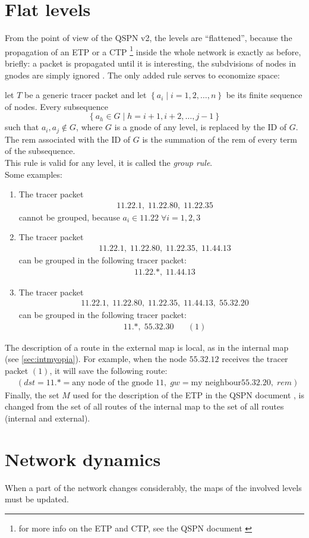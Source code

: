 \documentclass[a4paper]{article}
\newcommand{\T}[1]{\textrm{#1}}
\newcommand{\pgra}[1]{\left\{#1\right\}}
\newcommand{\eal}[1]{{\begin{align*} #1 \end{align*}}}
\def\'{{\;\;\;}}
\begin{document}
\section{Flat levels}
\label{sec:flat}
From the point of view of the QSPN v2, the levels are ``flattened'', because
the propagation of an ETP or a CTP \footnote{for more info on the ETP and CTP,
see the QSPN document \cite{qspndoc}} inside the whole network is exactly as
before, briefly: a packet is propagated until it is interesting, the
subdvisions of nodes in gnodes are simply ignored . The only
added rule serves to economize space: 

let $T$ be a generic tracer packet and let $\pgra{a_i\;|\;i=1,2,\dots,n}$ be its finite sequence of nodes.
Every subsequence \[\pgra{a_h\in G\;|\;h=i+1,i+2,\dots,j-1}\]
such that $a_i,a_j\notin G$, where $G$ is a gnode of any level, is replaced by
the ID of $G$. The rem associated with the ID of $G$ is the summation of the
rem of every term of the subsequence.\\
This rule is valid for any level, it is called the \emph{group rule}.\\
Some examples:
\begin{enumerate}
	\item The tracer packet
		\eal{&11.22.1,\;11.22.80,\;11.22.35}
		cannot be grouped, because $a_i\in 11.22\;\forall i =1,2,3$
	\item The tracer packet
		\eal{&11.22.1,\;11.22.80,\;11.22.35,\;11.44.13}
		can be grouped in the following tracer packet:
		\eal{&11.22.*,\;11.44.13}
	\item The tracer packet
		\eal{&11.22.1,\;11.22.80,\;11.22.35,\;11.44.13,\;55.32.20}
		can be grouped in the following tracer packet:
		\eal{&11.*,\;55.32.30\'\'(1)}
\end{enumerate}
The description of a route in the external map is local, as in the internal
map (see \ref{sec:intmyopia}). For example, when the node $55.32.12$ receives
the tracer packet $(1)$, it will save the following route:
\eal{&(dst=11.*=\T{any node of the gnode $11$},\;gw=\T{my neighbour
$55.32.20$},\;rem)
}
Finally, the set $M$ used for the description of the ETP in the QSPN document
\cite{qspndoc}, is changed from the set of all routes of the internal map to
the set of all routes (internal and external).

\section{Network dynamics}
When a part of the network changes considerably, the maps of the involved
levels must be updated.
\end{document}
